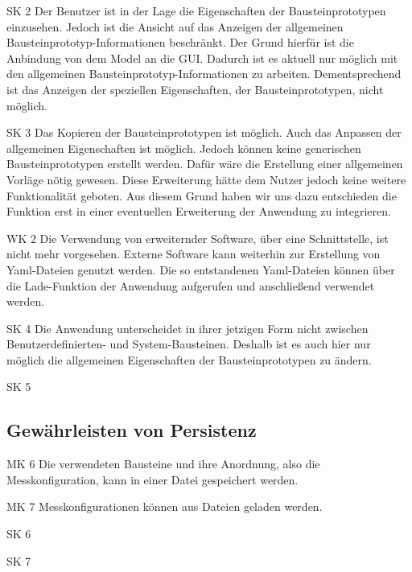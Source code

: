 \documentclass[parskip=full]{scrartcl}
\begin{document}
\begin{description}
	\item{SK 2} Der Benutzer ist in der Lage die Eigenschaften der Bausteinprototypen einzusehen. Jedoch ist die Ansicht auf das Anzeigen der \gls{allgemeinen Bausteinprototyp-Informationen} beschränkt. Der Grund hierfür ist die Anbindung von dem Model an die GUI. Dadurch ist es aktuell nur möglich mit den allgemeinen Bausteinprototyp-Informationen zu arbeiten. Dementsprechend ist das Anzeigen der speziellen Eigenschaften, der Bausteinprototypen, nicht möglich.
	\item{SK 3} Das Kopieren der Bausteinprototypen ist möglich. Auch das Anpassen der allgemeinen Eigenschaften ist möglich. Jedoch können keine generischen Bausteinprototypen erstellt werden. Dafür wäre die Erstellung einer allgemeinen Vorläge nötig gewesen. Diese Erweiterung hätte dem Nutzer jedoch keine weitere Funktionalität geboten. Aus diesem Grund haben wir uns dazu entschieden die Funktion erst in einer eventuellen Erweiterung der Anwendung zu integrieren.
	\item{WK 2} Die Verwendung von erweiternder Software, über eine Schnittstelle, ist nicht mehr vorgesehen. Externe Software kann weiterhin zur Erstellung von Yaml-Dateien genutzt werden. Die so entstandenen Yaml-Dateien können über die Lade-Funktion der Anwendung aufgerufen und anschließend verwendet werden.
	\item{SK 4} Die Anwendung unterscheidet in ihrer jetzigen Form nicht zwischen Benutzerdefinierten- und System-Bausteinen. Deshalb ist es auch hier nur möglich die allgemeinen Eigenschaften der Bausteinprototypen zu ändern.
	\item{SK 5}
\end{description}
		
\subsection{Gewährleisten von Persistenz}

\begin{description}
\item{MK 6} Die verwendeten Bausteine und ihre Anordnung, also die Messkonfiguration, kann in einer Datei gespeichert werden.
\item{MK 7} Messkonfigurationen können aus Dateien geladen werden.
\item{SK 6}
\item{SK 7}
\end{description}
\end{document}
